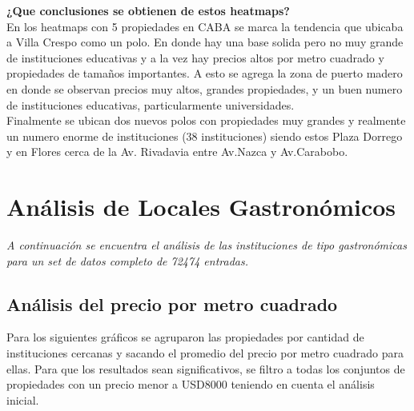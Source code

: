 \documentclass[a4paper, 10pt]{article}
\begin{document}
				\textbf{¿Que conclusiones se obtienen de estos heatmaps?}\\
				En los heatmaps con 5 propiedades en CABA se marca la tendencia que ubicaba a 
				Villa Crespo como un polo. En donde hay una base solida pero no muy grande de 
				instituciones educativas y a la vez hay precios altos por metro cuadrado y 
				propiedades de tamaños importantes. A esto se agrega la zona de puerto madero 
				en donde se observan precios muy altos, grandes propiedades, y un buen numero 
				de instituciones educativas, particularmente universidades.\\
				Finalmente se ubican dos nuevos polos con propiedades muy grandes y realmente un numero 
				enorme de instituciones (38 instituciones) siendo estos Plaza Dorrego y en Flores cerca 
				de la Av. Rivadavia entre Av.Nazca y Av.Carabobo.
		\section{Análisis de Locales Gastronómicos}
			\emph{A continuación se encuentra el análisis de las instituciones de tipo gastronómicas para 
			un set de datos completo de 72474 entradas.}
			\subsection{Análisis del precio por metro cuadrado}
				Para los siguientes gráficos se agruparon las propiedades por cantidad de instituciones 
				cercanas y sacando el promedio del precio por metro cuadrado para ellas. 
				Para que los resultados sean significativos, se filtro a todas los conjuntos 
				de propiedades con un precio menor a \textdollar USD8000 teniendo en cuenta 
				el análisis inicial.
				
\end{document}
